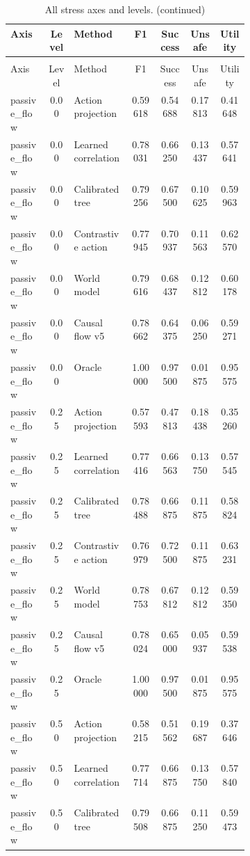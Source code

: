\documentclass{article}
\begin{document}
\begin{center}
\scriptsize
\begin{longtable}{p{0.16\linewidth}cp{0.24\linewidth}cccc}
\caption{All stress axes and levels.}\label{tab:full-stress}\\
\toprule
Axis & Level & Method & F1 & Success & Unsafe & Utility\\
\midrule
\endfirsthead
\caption[]{All stress axes and levels. (continued)}\\
\toprule
Axis & Level & Method & F1 & Success & Unsafe & Utility\\
\midrule
\endhead
passive\_flow & 0.00 & Action projection & 0.59618 & 0.54688 & 0.17813 & 0.41648\\
passive\_flow & 0.00 & Learned correlation & 0.78031 & 0.66250 & 0.13437 & 0.57641\\
passive\_flow & 0.00 & Calibrated tree & 0.79256 & 0.67500 & 0.10625 & 0.59963\\
passive\_flow & 0.00 & Contrastive action & 0.77945 & 0.70937 & 0.11563 & 0.62570\\
passive\_flow & 0.00 & World model & 0.79616 & 0.68437 & 0.12812 & 0.60178\\
passive\_flow & 0.00 & Causal flow v5 & 0.78662 & 0.64375 & 0.06250 & 0.59271\\
passive\_flow & 0.00 & Oracle & 1.00000 & 0.97500 & 0.01875 & 0.95575\\
passive\_flow & 0.25 & Action projection & 0.57593 & 0.47813 & 0.18438 & 0.35260\\
passive\_flow & 0.25 & Learned correlation & 0.77416 & 0.66563 & 0.13750 & 0.57545\\
passive\_flow & 0.25 & Calibrated tree & 0.78488 & 0.66875 & 0.11875 & 0.58824\\
passive\_flow & 0.25 & Contrastive action & 0.76979 & 0.72500 & 0.11875 & 0.63231\\
passive\_flow & 0.25 & World model & 0.78753 & 0.67812 & 0.12812 & 0.59350\\
passive\_flow & 0.25 & Causal flow v5 & 0.78024 & 0.65000 & 0.05937 & 0.59538\\
passive\_flow & 0.25 & Oracle & 1.00000 & 0.97500 & 0.01875 & 0.95575\\
passive\_flow & 0.50 & Action projection & 0.58215 & 0.51562 & 0.19687 & 0.37646\\
passive\_flow & 0.50 & Learned correlation & 0.77714 & 0.66875 & 0.13750 & 0.57840\\
passive\_flow & 0.50 & Calibrated tree & 0.79508 & 0.66875 & 0.11250 & 0.59473\\

\end{longtable}
\end{center}
\end{document}
